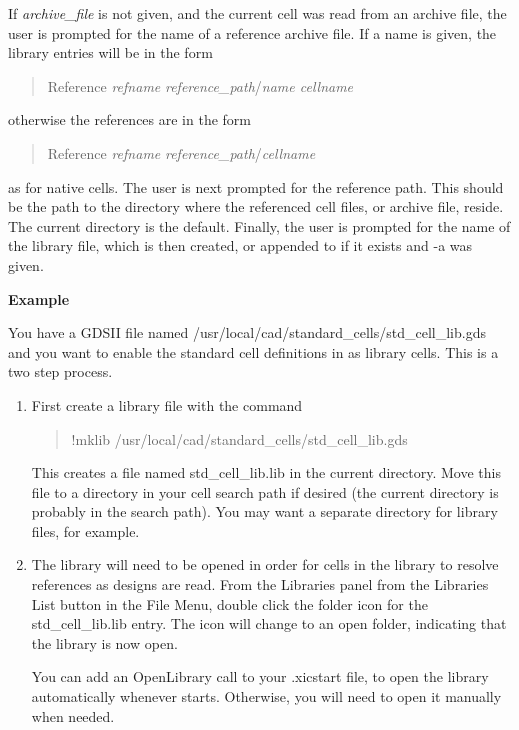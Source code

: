 If {\it archive\_file} is not given, and the current cell was read
from an archive file, the user is prompted for the name of a reference
archive file.  If a name is given, the library entries will be in the
form
\begin{quote}
{\vt Reference} {\it refname} {\it reference\_path\/}/{\it name cellname}
\end{quote}
otherwise the references are in the form
\begin{quote}
{\vt Reference} {\it refname} {\it reference\_path\/}/{\it cellname}
\end{quote}
as for native cells.  The user is next prompted for the reference
path.  This should be the path to the directory where the referenced
cell files, or archive file, reside.  The current directory is the
default.  Finally, the user is prompted for the name of the library
file, which is then created, or appended to if it exists and {\vt -a}
was given.

{\bf Example}

You have a GDSII file named
{\vt /usr/local/cad/standard\_cells/std\_cell\_lib.gds} and you
want to enable the standard cell definitions in {\Xic} as
library cells.  This is a two step process.

\begin{enumerate}
\item{First create a library file with the command
\begin{quote}
\vt !mklib /usr/local/cad/standard\_cells/std\_cell\_lib.gds
\end{quote}
This creates a file named {\vt std\_cell\_lib.lib} in the current
directory.  Move this file to a directory in your cell search path if
desired (the current directory is probably in the search path).  You
may want a separate directory for library files, for example.}

\item{The library will need to be opened in order for cells in the
library to resolve references as designs are read.  From the {\cb
Libraries} panel from the {\cb Libraries List} button in the {\cb File
Menu}, double click the folder icon for the {\vt std\_cell\_lib.lib}
entry.  The icon will change to an open folder, indicating that the
library is now open.

You can add an {\vt OpenLibrary} call to your {\vt .xicstart} file, to
open the library automatically whenever {\Xic} starts.  Otherwise, you
will need to open it manually when needed.}
\end{enumerate}

